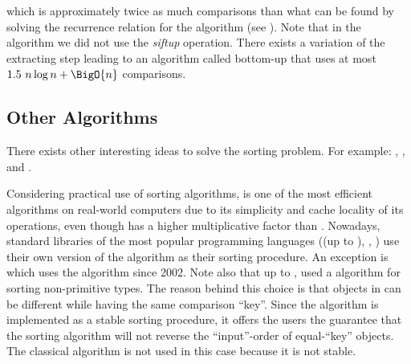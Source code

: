 which is approximately twice as much comparisons than what can be found by
solving the recurrence relation for the \mergesort algorithm (see
\citet*{OEIS:A001855}). Note that in the \heapsort algorithm we did not use the
\emph{siftup} operation. There exists \cite{wegener:1993} a variation of the
extracting step leading to an algorithm called bottom-up \heapsort that uses at
most \(1.5~n \log n + \BigO{n}\) comparisons.

\subsection*{Other Algorithms}

There exists other interesting ideas to solve the sorting problem. For
example: \shellsort \cite{shell:1959}, \smoothsort \cite{dijkstra:1982},
\introsort \cite{musser:1997} and \timsort \cite{martelli:2006}.

Considering practical use of sorting algorithms, \quicksort is one of the most
efficient algorithms on real-world computers due to its simplicity and cache
locality of its operations, even though \quicksort has a higher
multiplicative factor than \mergesort. Nowadays, standard libraries of the most
popular programming languages (\Java (up to ), \CC, \CXX) use their own
version of the \quicksort algorithm as their sorting procedure. An exception is
\Python which uses the \timsort algorithm since 2002. Note also that up to , \Java used a \mergesort algorithm for sorting non-primitive types. The
reason behind this choice is that objects in \Java can be different while
having the same comparison ``key''. Since the \Java \mergesort algorithm is
implemented as a stable sorting procedure, it offers the users the guarantee
that the sorting algorithm will not reverse the ``input''-order of equal-``key'' objects.
The classical \quicksort algorithm is not used in this case because it is not
stable.

